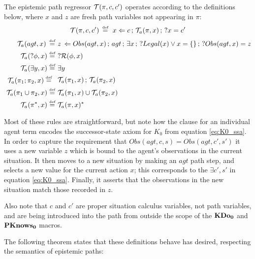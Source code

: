 \begin{defnL}
 The epistemic path regressor
$\mathcal{T}(\pi,c,c')$ operates according to the definitions below, where
$x$ and $z$ are fresh path variables not appearing in $\pi$:\label{def:EpistemicPathRegression}\[
\mathcal{T}(\pi,c,c')\,\stackrel{\mbox{\tiny def}}{=}\,\, x\Leftarrow c\,;\,\mathcal{T}_{a}(\pi,x)\,;\,?x=c'\]
 \begin{align*}
\mathcal{T}_{a}(agt,x)\,\stackrel{\mbox{\tiny def}}{=}\,\, & z\,\Leftarrow Obs(agt,x)\,;\, agt\,;\,\exists x\,;\,?Legal(x)\vee x=\{\}\,;\,?Obs(agt,x)=z\\
\mathcal{T}_{a}(?\phi,x)\stackrel{\mbox{\tiny def}}{=}\,\, & ?\mathcal{R}(\phi,x)\\
\mathcal{T}_{a}(\exists y,x)\stackrel{\mbox{\tiny def}}{=}\,\, & \exists y\\
\begin{array}{c}
\mathcal{T}_{a}(\pi_{1};\pi_{2},x)\stackrel{\mbox{\tiny def}}{=}\,\,\end{array} & \mathcal{T}_{a}(\pi_{1},x)\,;\,\mathcal{T}_{a}(\pi_{2},x)\\
\mathcal{T}_{a}(\pi_{1}\cup\pi_{2},x)\stackrel{\mbox{\tiny def}}{=}\,\, & \mathcal{T}_{a}(\pi_{1},x)\cup\mathcal{T}_{a}(\pi_{2},x)\\
\mathcal{T}_{a}(\pi^{*},x)\stackrel{\mbox{\tiny def}}{=}\,\, & \mathcal{T}_{a}(\pi,x)^{*}\end{align*}

\end{defnL}
Most of these rules are straightforward, but note how the clause for
an individual agent term encodes the successor-state axiom for $K_{0}$
from equation \eqref{eq:K0_ssa}. In order to capture the requirement
that $Obs(agt,c,s)=Obs(agt,c',s')$ it uses a new variable $z$ which
is bound to the agent's observations in the current situation. It
then moves to a new situation by making an $agt$ path step, and selects
a new value for the current action $x$; this corresponds to the $\exists c',s'$
in equation \eqref{eq:K0_ssa}. Finally, it asserts that the observations
in the new situation match those recorded in $z$.

Also note that $c$ and $c'$ are proper situation calculus variables,
not path variables, and are being introduced into the path from outside
the scope of the $\mathbf{KDo_{0}}$ and $\mathbf{PKnows_{0}}$ macros.

The following theorem states that these definitions behave has desired,
respecting the semantics of epistemic paths:

